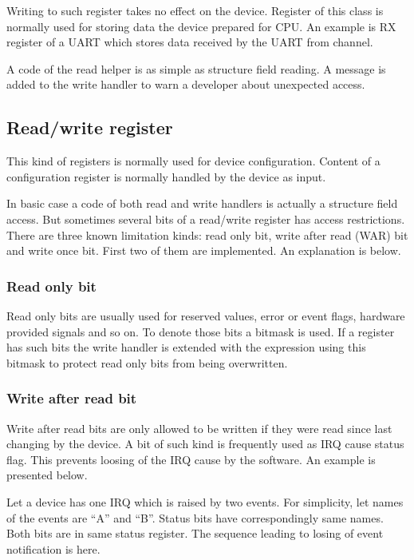 \documentclass[conference,compsoc,a4paper]{IEEEtran}
\begin{document}
Writing to such register takes no effect on the device.
Register of this class is normally used for storing data the device
prepared for CPU.
An example is RX register of a UART which stores data received by
the UART from channel.

A code of the read helper is as simple as structure field reading.
A message is added to the write handler to warn a developer about
unexpected access.

\subsection{Read/write register}

This kind of registers is normally used for device configuration.
Content of a configuration register is normally handled by the device
as input.

In basic case a code of both read and write handlers is actually a
structure field access.
But sometimes several bits of a read/write register has access
restrictions.
There are three known limitation kinds: read only bit,
write after read (WAR) bit and write once bit.
First two of them are implemented.
An explanation is below.

\subsubsection{Read only bit}

Read only bits are usually used for reserved values, error or event
flags, hardware provided signals and so on.
To denote those bits a bitmask is used.
If a register has such bits the write handler is extended with
the expression using this bitmask to protect read only bits from
being overwritten.

\subsubsection{Write after read bit}

Write after read bits are only allowed to be written if they were
read since last changing by the device.
A bit of such kind is frequently used as IRQ cause status flag.
This prevents loosing of the IRQ cause by the software.
An example is presented below.

Let a device has one IRQ which is raised by two events.
For simplicity, let names of the events are ``A'' and ``B''.
Status bits have correspondingly same names.
Both bits are in same status register.
The sequence leading to losing of event notification is here.
\end{document}
